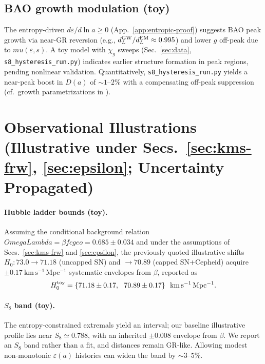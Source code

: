 \documentclass[aps,prd,onecolumn,superscriptaddress,nofootinbib]{revtex4-2}
\def\OmL{OmegaLambda}%
\def\cgeo{cgeo}%
\def\mu{mu}%
\def\Omega_\Lambda{OmegaLambda}%
\providecommand{\OmL}{\Omega_\Lambda}
\providecommand{\cgeo}{c_{\rm geo}}
\providecommand{\be}{\begin{equation}}
\providecommand{\ee}{\end{equation}}
\begin{document}
\subsection{BAO growth modulation (toy)}
The entropy-driven \(d\varepsilon/d\ln a \geq 0\) (App.~\ref{app:entropic-proof}) suggests BAO peak growth via near-GR reversion (e.g., \(d_L^{\rm GW}/d_L^{\rm EM}\approx 0.995\)) and lower \(g\) off-peak due to \(\mu(\varepsilon,s)\). A toy model with \(\chi_g\) sweeps (Sec.~\ref{sec:data}, \texttt{s8\_hysteresis\_run.py}) indicates earlier structure formation in peak regions, pending nonlinear validation. Quantitatively, \texttt{s8\_hysteresis\_run.py} yields a near-peak boost in \(D(a)\) of \(\sim 1\text{--}2\%\) with a compensating off-peak suppression (cf.\ growth parametrizations in \cite{BelliniSawicki2014}).

\section{Observational Illustrations (Illustrative under Secs.~\ref{sec:kms-frw}, \ref{sec:epsilon}; Uncertainty Propagated)}
\label{sec:obs}

\paragraph{Hubble ladder bounds (toy).}
Assuming the conditional background relation \(\OmL=\beta f\cgeo=0.685\pm 0.034\) and under the assumptions of Secs.~\ref{sec:kms-frw} and \ref{sec:epsilon}, the previously quoted illustrative shifts \(H_0: 73.0\to 71.18\) (uncapped SN) and \(\to 70.89\) (capped SN+Cepheid) acquire \(\pm 0.17~\mathrm{km\,s^{-1}\,Mpc^{-1}}\) systematic envelopes from \(\beta\), reported as
\be
H_0^{\rm toy}=\{71.18\pm 0.17,\ \ 70.89\pm 0.17\}\ \ \mathrm{km\,s^{-1}\,Mpc^{-1}}.
\ee

\paragraph{\(S_8\) band (toy).}
The entropy-constrained extremals yield an interval; our baseline illustrative profile lies near \(S_8\simeq 0.788\), with an inherited \(\pm 0.008\) envelope from \(\beta\). We report an \(S_8\) band rather than a fit, and distances remain GR-like. Allowing modest non-monotonic \(\varepsilon(a)\) histories can widen the band by \(\sim 3\text{--}5\%\).
\end{document}

